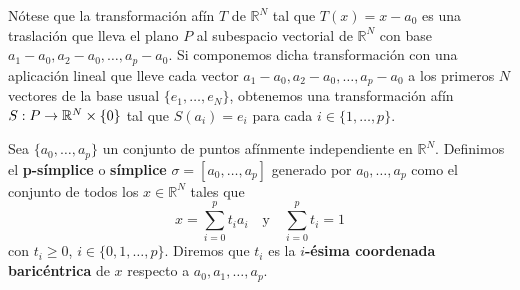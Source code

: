 Nótese que la transformación afín $T$ de $\mathbb{R}^{N}$ tal que
$T(x) = x - a_{0}$ es una traslación que lleva el plano $P$ al subespacio
vectorial de $\mathbb{R}^{N}$ con base
$a_{1}-a_{0}, a_{2}-a_{0}, \ldots, a_{p}-a_{0}$. Si componemos dicha transformación
con una aplicación lineal que lleve cada vector $a_{1}-a_{0}, a_{2}-a_{0}, \ldots
, a_{p}-a_{0}$ a los primeros $N$ vectores de la base usual $\{e_{1}, \ldots, e_{N}
\}$, obtenemos una transformación afín $S: P \rightarrow \mathbb{R}^{N}\times \{0\}$ tal
que $S(a_{i}) = e_{i}$ para cada $i \in \{1, \ldots, p\}$.

\begin{definicion}
	\label{def:simplex} Sea $\{a_{0}, \ldots, a_{p}\}$ un conjunto de puntos afínmente
	independiente en $\mathbb{R}^{N}$. Definimos el \textbf{p-símplice} o \textbf{símplice}
	$\sigma = [a_{0}, \ldots, a_{p}]$ generado por $a_{0}, \ldots, a_{p}$ como el
	conjunto de todos los $x \in \mathbb{R}^{N}$ tales que
	\[
	x=\sum_{i=0}^{p}t_{i}a_{i}\quad \text{y}\quad \sum_{i=0}^{p}t_{i}=1
	\]
	con $t_{i}\geq 0$, $i \in \{0, 1, \ldots, p\}$. Diremos que $t_{i}$ es la
	\textbf{$i$-ésima coordenada baricéntrica} de $x$ respecto a $a_{0}, a_{1}, \ldots
	, a_{p}$.
\end{definicion}

